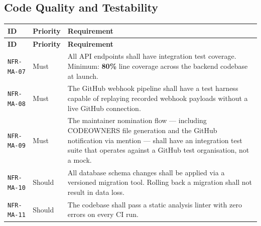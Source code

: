 \documentclass[12pt,a4paper]{article}
\begin{document}
\subsection{Code Quality and Testability}
\begin{longtable}{L{2.2cm} L{1.8cm} L{9.3cm}}
  \color{white}\bfseries ID & \color{white}\bfseries Priority & \color{white}\bfseries Requirement \\
  \endfirsthead
  \color{white}\bfseries ID & \color{white}\bfseries Priority & \color{white}\bfseries Requirement \\
  \endhead\hline
  \texttt{NFR-MA-07} & Must   & All API endpoints shall have integration test coverage. Minimum: \textbf{80\%} line coverage across the backend codebase at launch. \\
  \texttt{NFR-MA-08} & Must   & The GitHub webhook pipeline shall have a test harness capable of replaying recorded webhook payloads without a live GitHub connection. \\
  \texttt{NFR-MA-09} & Must   & The maintainer nomination flow --- including CODEOWNERS file generation and the GitHub notification via mention --- shall have an integration test suite that operates against a GitHub test organisation, not a mock. \\
  \texttt{NFR-MA-10} & Should & All database schema changes shall be applied via a versioned migration tool. Rolling back a migration shall not result in data loss. \\
  \texttt{NFR-MA-11} & Should & The codebase shall pass a static analysis linter with zero errors on every CI run. \\
  \hline
\end{longtable}
\end{document}
